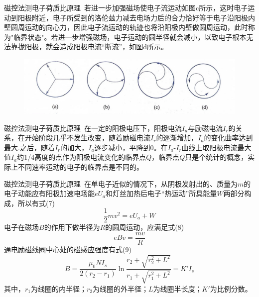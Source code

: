 \documentclass{beamer}
\begin{document}
    \begin{frame}{磁控法测电子荷质比原理}{\thesubsection \, \subsecname}
        若进一步加强磁场使电子流运动如图c所示，这时电子运动到阳极附近，电子所受到的洛伦兹力减去电场力后的合力恰好等于电子沿阳极内壁圆周运动的向心力，因此电子流运动的轨迹也将沿阳极内壁做圆周运动，此时称为"临界状态"。若进一步增强磁场，电子运动的圆半径就会减小，以致电子根本无法靠拢阳极，就会造成阳极电流“断流”，如图d所示。
        \begin{figure}[htbp]
            \centering
            \includegraphics[scale=0.7]{gallery/pic2.jpg}
        \end{figure}
    \end{frame}

    \begin{frame}{磁控法测电子荷质比原理}{\thesubsection \, \subsecname}
        在一定的阳极电压下，阳极电流$I_a$与励磁电流$I_r$的关系，在开始阶段几乎不发生改变，随着励磁电流$I_r$的逐渐增加，$I_a$的变化曲率达到最大.之后，随着$I_r$的加大，$I_a$逐步减小，平降到0。在$I_a$-$I_r$曲线上取阳极电流最大值$I_a$约1/4高度的点作为阳极电流变化的临界点$Q$，临界点$Q$只是个统计的概念，实际上不同速率运动的电子的临界点是不同的。
    \end{frame}

    \begin{frame}{磁控法测电子荷质比原理}{\thesubsection \, \subsecname}
        在单电子近似的情况下，从阴极发射出的、质量为$m$的电子动能应有阳极加速电场能$eU_a$和灯丝加热后电子“热运动”所具能量$W$两部分构成，所以有式(7)
        \begin{equation}
            \frac{1}{2}mv^2 = eU_a + W
        \end{equation}
        电子在磁场$B$的作用下做半径为$R$的圆周运动，应满足式(8)
        \begin{equation}
            eBv = \frac{mv}{R}
        \end{equation}
        通电励磁线圈中心处的磁感应强度有式(9)
        \begin{equation}
            B = \frac{\mu_0NI_s}{2(r_2-r_1)}\ln \frac{r_2+\sqrt{r_2^2+L^2}}{r_1+\sqrt{r_1^2+L^2}} = K'I_s
        \end{equation}
        其中，$r_1$为线圈的内半径；$r_2$为线圈的外半径；$L$为线圈半长度；$K'$为比例分数。
    \end{frame}
\end{document}
